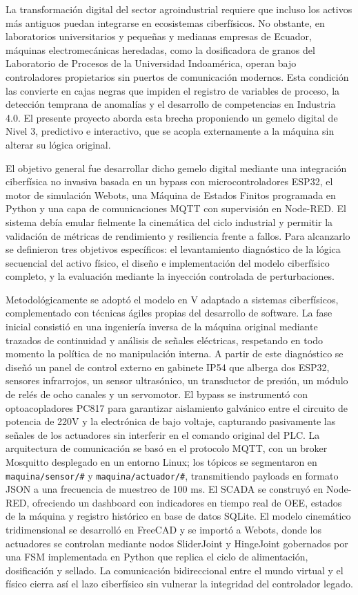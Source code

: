 La transformación digital del sector agroindustrial requiere que incluso los activos más antiguos puedan integrarse en ecosistemas ciberfísicos. No obstante, en laboratorios universitarios y pequeñas y medianas empresas de Ecuador, máquinas electromecánicas heredadas, como la dosificadora de granos del Laboratorio de Procesos de la Universidad Indoamérica, operan bajo controladores propietarios sin puertos de comunicación modernos. Esta condición las convierte en cajas negras que impiden el registro de variables de proceso, la detección temprana de anomalías y el desarrollo de competencias en Industria 4.0. El presente proyecto aborda esta brecha proponiendo un gemelo digital de Nivel 3, predictivo e interactivo, que se acopla externamente a la máquina sin alterar su lógica original.

El objetivo general fue desarrollar dicho gemelo digital mediante una integración ciberfísica no invasiva basada en un bypass con microcontroladores ESP32, el motor de simulación Webots, una Máquina de Estados Finitos programada en Python y una capa de comunicaciones MQTT con supervisión en Node-RED. El sistema debía emular fielmente la cinemática del ciclo industrial y permitir la validación de métricas de rendimiento y resiliencia frente a fallos. Para alcanzarlo se definieron tres objetivos específicos: el levantamiento diagnóstico de la lógica secuencial del activo físico, el diseño e implementación del modelo ciberfísico completo, y la evaluación mediante la inyección controlada de perturbaciones.

Metodológicamente se adoptó el modelo en V adaptado a sistemas ciberfísicos, complementado con técnicas ágiles propias del desarrollo de software. La fase inicial consistió en una ingeniería inversa de la máquina original mediante trazados de continuidad y análisis de señales eléctricas, respetando en todo momento la política de no manipulación interna. A partir de este diagnóstico se diseñó un panel de control externo en gabinete IP54 que alberga dos ESP32, sensores infrarrojos, un sensor ultrasónico, un transductor de presión, un módulo de relés de ocho canales y un servomotor. El bypass se instrumentó con optoacopladores PC817 para garantizar aislamiento galvánico entre el circuito de potencia de 220V y la electrónica de bajo voltaje, capturando pasivamente las señales de los actuadores sin interferir en el comando original del PLC. La arquitectura de comunicación se basó en el protocolo MQTT, con un broker Mosquitto desplegado en un entorno Linux; los tópicos se segmentaron en \texttt{maquina/sensor/\#} y \texttt{maquina/actuador/\#}, transmitiendo payloads en formato JSON a una frecuencia de muestreo de 100 ms. El SCADA se construyó en Node-RED, ofreciendo un dashboard con indicadores en tiempo real de OEE, estados de la máquina y registro histórico en base de datos SQLite. El modelo cinemático tridimensional se desarrolló en FreeCAD y se importó a Webots, donde los actuadores se controlan mediante nodos SliderJoint y HingeJoint gobernados por una FSM implementada en Python que replica el ciclo de alimentación, dosificación y sellado. La comunicación bidireccional entre el mundo virtual y el físico cierra así el lazo ciberfísico sin vulnerar la integridad del controlador legado.


